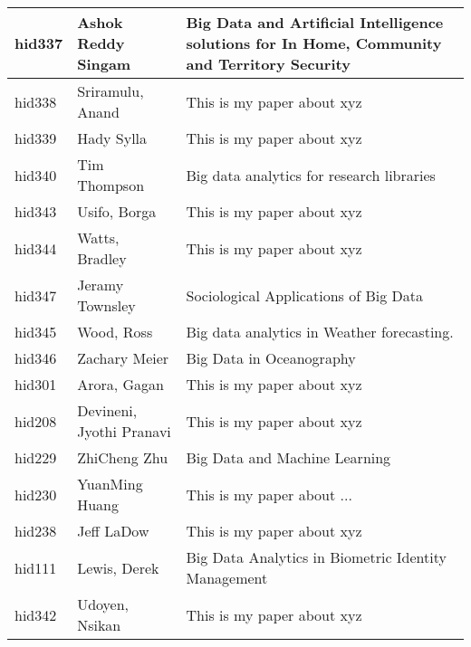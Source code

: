 \documentclass[12pt]{article}
\begin{document}
\begin{footnotesize}
\begin{longtable}{|p{1cm}p{5cm}p{9cm}|}
\hline
hid337 & Ashok Reddy Singam & Big Data and Artificial Intelligence solutions for In Home, Community and Territory Security  \\
\hline
hid338 & Sriramulu, Anand & This is my paper about xyz  \\
\hline
hid339 & Hady Sylla & This is my paper about xyz  \\
\hline
hid340 & Tim Thompson & Big data analytics for research libraries  \\
\hline
hid343 & Usifo, Borga & This is my paper about xyz  \\
\hline
hid344 & Watts, Bradley & This is my paper about xyz  \\
\hline
hid347 & Jeramy Townsley & Sociological Applications of Big Data  \\
\hline
hid345 & Wood, Ross & Big data analytics in Weather forecasting.  \\
\hline
hid346 & Zachary Meier & Big Data in Oceanography  \\
\hline
hid301 & Arora, Gagan & This is my paper about xyz  \\
\hline
hid208 & Devineni, Jyothi Pranavi & This is my paper about xyz  \\
\hline
hid229 & ZhiCheng Zhu & Big Data and Machine Learning  \\
\hline
hid230 & YuanMing Huang & This is my paper about ...  \\
\hline
hid238 & Jeff LaDow & This is my paper about xyz  \\
\hline
hid111 & Lewis, Derek & Big Data Analytics in Biometric Identity Management  \\
\hline
hid342 & Udoyen, Nsikan & This is my paper about xyz  \\
\hline
\end{longtable}
\end{footnotesize}
\newpage
\end{document}

